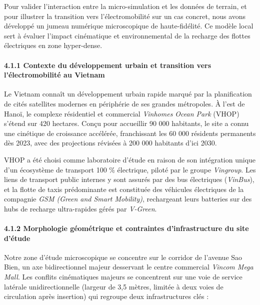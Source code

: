\documentclass[10pt, a4paper]{article}
\begin{document}
Pour valider l'interaction entre la micro-simulation et les données de
terrain, et pour illustrer la transition vers l'électromobilité sur un
cas concret, nous avons développé un jumeau numérique microscopique de
haute-fidélité. Ce modèle local sert à évaluer l'impact cinématique et
environnemental de la recharge des flottes électriques en zone
hyper-dense.

\paragraph{4.1.1 Contexte du développement urbain et transition vers
l'électromobilité au
Vietnam}\label{contexte-du-duxe9veloppement-urbain-et-transition-vers-luxe9lectromobilituxe9-au-vietnam}

Le Vietnam connaît un développement urbain rapide marqué par la
planification de cités satellites modernes en périphérie de ses grandes
métropoles. À l'est de Hanoï, le complexe résidentiel et commercial
\emph{Vinhomes Ocean Park} (VHOP) s'étend sur 420 hectares. Conçu pour
accueillir 90 000 habitants, le site a connu une cinétique de croissance
accélérée, franchissant les 60 000 résidents permanents dès 2023, avec
des projections révisées à 200 000 habitants d'ici 2030.

VHOP a été choisi comme laboratoire d'étude en raison de son intégration
unique d'un écosystème de transport 100 \% électrique, piloté par le
groupe \emph{Vingroup}. Les liens de transport public internes y sont
assurés par des bus électriques (\emph{VinBus}), et la flotte de taxis
prédominante est constituée des véhicules électriques de la compagnie
\emph{GSM (Green and Smart Mobility)}, rechargeant leurs batteries sur
des hubs de recharge ultra-rapides gérés par \emph{V-Green}.

\paragraph{4.1.2 Morphologie géométrique et contraintes d'infrastructure
du site
d'étude}\label{morphologie-guxe9omuxe9trique-et-contraintes-dinfrastructure-du-site-duxe9tude}

Notre zone d'étude microscopique se concentre sur le corridor de
l'avenue Sao Bien, un axe bidirectionnel majeur desservant le centre
commercial \emph{Vincom Mega Mall}. Les conflits cinématiques majeurs se
concentrent sur une voie de service latérale unidirectionnelle (largeur
de 3,5 mètres, limitée à deux voies de circulation après insertion) qui
regroupe deux infrastructures clés :
\end{document}
